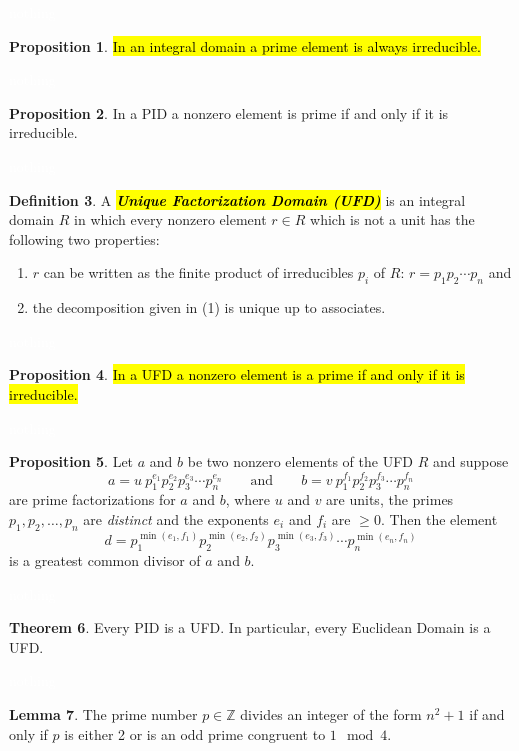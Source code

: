 \documentclass{article}
\theoremstyle{definition}
\newtheorem{thm}{Theorem}[section]
\newtheorem{lem}[thm]{Lemma}
\newtheorem{prop}[thm]{Proposition}
\newtheorem{defn}[thm]{Definition}
\newcommand{\nl}{\textcolor{white}{nothing}}
\newcommand{\Z}{\mathbb{Z}}
\begin{document}
\nl

\begin{prop}
\hl{In an integral domain a prime element is always irreducible.}
\end{prop}

\nl

\begin{prop}
In a PID a nonzero element is prime if and only if it is irreducible.
\end{prop}

\nl

\begin{defn}
A \hl{\textit{\textbf{Unique Factorization Domain (UFD)}}} is an integral domain $R$ in which every nonzero element $r\in R$ which is not a unit has the following two properties:
\begin{enumerate}
\item $r$ can be written as the finite product of irreducibles $p_i$ of $R$: $r = p_1p_2\cdots p_n$ and
\item the decomposition given in (1) is unique up to associates. 
\end{enumerate}
\end{defn}

\nl

\begin{prop}
\hl{In a UFD a nonzero element is a prime if and only if it is irreducible.}
\end{prop}

\nl

\begin{prop}
Let $a$ and $b$ be two nonzero elements of the UFD $R$ and suppose
\[a = u\ p_1^{e_1}p_2^{e_2}p_3^{e_3}\cdots p_n^{e_n}\qquad\text{and}\qquad b = v\ p_1^{f_1}p_2^{f_2}p_3^{f_3}\cdots p_n^{f_n}\]
are prime factorizations for $a$ and $b$, where $u$ and $v$ are units, the primes $p_1,p_2,\ldots,p_n$ are \textit{distinct} and the exponents $e_i$ and $f_i$ are $\geq 0$. Then the element 
\[d = p_1^{\min(e_1,f_1)}p_2^{\min(e_2,f_2)}p_3^{\min(e_3,f_3)}\cdots p_n^{\min(e_n,f_n)}\]
is a greatest common divisor of $a$ and $b$. 
\end{prop}

\nl

\begin{thm}
Every PID is a UFD. In particular, every Euclidean Domain is a UFD. 
\end{thm}

\nl

\begin{lem}
The prime number $p\in \Z$ divides an integer of the form $n^2 + 1$ if and only if $p$ is either 2 or is an odd prime congruent to $1\mod 4$.
\end{lem}
\end{document}
